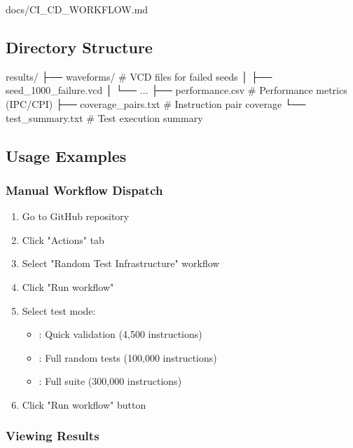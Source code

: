 \begin{relocated}{docs/CI_CD_WORKFLOW.md}
\subsection{Directory Structure}\label{um:flow:ci-cd-workflow:directory-structure}

\begin{textblock}
results/
├── waveforms/           # VCD files for failed seeds
│   ├── seed_1000_failure.vcd
│   └── ...
├── performance.csv      # Performance metrics (IPC/CPI)
├── coverage_pairs.txt   # Instruction pair coverage
└── test_summary.txt     # Test execution summary
\end{textblock}

\subsection{Usage Examples}\label{um:flow:ci-cd-workflow:usage-examples}

\subsubsection{Manual Workflow Dispatch}\label{um:flow:ci-cd-workflow:manual-workflow-dispatch}

\begin{enumerate}
\def\labelenumi{\arabic{enumi}.}
\tightlist
\item
  Go to GitHub repository
\item
  Click "Actions" tab
\item
  Select "Random Test Infrastructure" workflow
\item
  Click "Run workflow"
\item
  Select test mode:

  \begin{itemize}
  \tightlist
  \item
    : Quick validation (4,500 instructions)
  \item
    : Full random tests (100,000 instructions)
  \item
    : Full suite (300,000 instructions)
  \end{itemize}
\item
  Click "Run workflow" button
\end{enumerate}

\subsubsection{Viewing Results}\label{um:flow:ci-cd-workflow:viewing-results}


\end{relocated}
